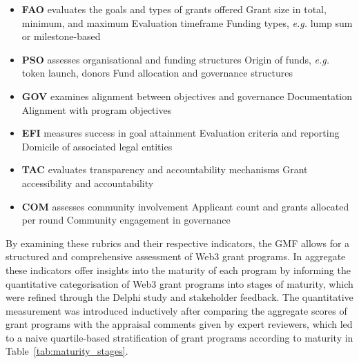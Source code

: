 \documentclass[conference]{IEEEtran}
\begin{document}
\footnotesize
\begin{itemize}
    \item \textbf{FAO} evaluates the goals and types of grants offered
        \subitem Grant size in total, minimum, and maximum
        \subitem Evaluation timeframe
        \subitem Funding types, \textit{e.g.} lump sum or milestone-based
    \item \textbf{PSO} assesses organisational and funding structures
        \subitem Origin of funds, \textit{e.g.} token launch, donors
        \subitem Fund allocation and governance structures
    \item \textbf{GOV} examines alignment between objectives and governance
        \subitem Documentation
        \subitem Alignment with program objectives
    \item \textbf{EFI} measures success in goal attainment
        \subitem Evaluation criteria and reporting
        \subitem Domicile of associated legal entities
    \item \textbf{TAC} evaluates transparency and accountability mechanisms
        \subitem Grant accessibility and accountability
    \item \textbf{COM} assesses community involvement
        \subitem Applicant count and grants allocated per round
        \subitem Community engagement in governance
\end{itemize}\vspace{7pt}
\normalsize

By examining these rubrics and their respective indicators, the GMF allows for a structured and comprehensive assessment of Web3 grant programs. In aggregate these indicators offer insights into the maturity of each program by informing the quantitative categorisation of Web3 grant programs into stages of maturity, which were refined through the Delphi study and stakeholder feedback. The quantitative measurement was introduced inductively after comparing the aggregate scores of grant programs with the appraisal comments given by expert reviewers, which led to a naive quartile-based stratification of grant programs according to maturity in Table~\ref{tab:maturity_stages}.
\end{document}
